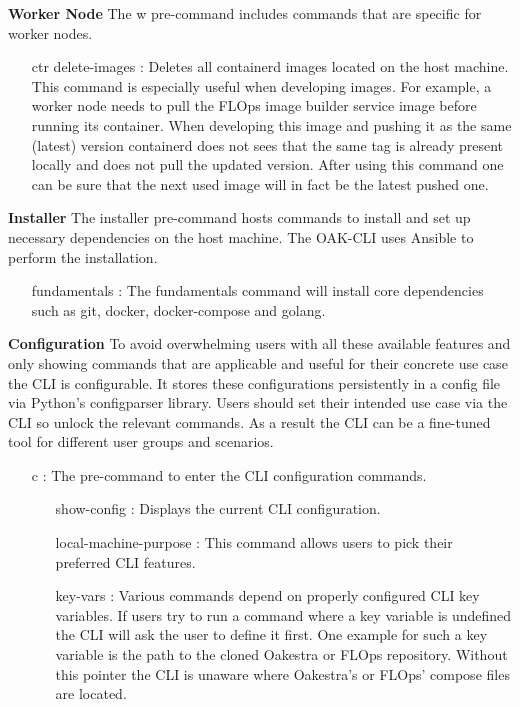 \vspace{5mm}
\textbf{Worker Node}\newline
The w pre-command includes commands that are specific for worker nodes.
\begin{itemize}
    \item [ctr delete-images]:
        Deletes all containerd images located on the host machine.
        This command is especially useful when developing images.
        For example, a worker node needs to pull the FLOps image builder service image before running its container.
        When developing this image and pushing it as the same (latest) version containerd does not sees that the same tag is already present locally and does not pull the updated version.
        After using this command one can be sure that the next used image will in fact be the latest pushed one.
\end{itemize}
\vspace{5mm}
\textbf{Installer}\newline
The installer pre-command hosts commands to install and set up necessary dependencies on the host machine.
The OAK-CLI uses Ansible to perform the installation.
\begin{itemize}
    \item [fundamentals]:
        The fundamentals command will install core dependencies such as git, docker, docker-compose and golang.
\end{itemize}
\vspace{5mm}
\textbf{Configuration}\newline
To avoid overwhelming users with all these available features and only showing commands that are applicable and useful for their concrete use case the CLI is configurable.
It stores these configurations persistently in a config file via Python's configparser library.
Users should set their intended use case via the CLI so unlock the relevant commands.
As a result the CLI can be a fine-tuned tool for different user groups and scenarios.
\begin{itemize}
    \item [c]:
        The pre-command to enter the CLI configuration commands.
        \begin{itemize}
            \item [show-config]:
                Displays the current CLI configuration.
            \item [local-machine-purpose]:
                This command allows users to pick their preferred CLI features.
            \item [key-vars]:
                Various commands depend on properly configured CLI key variables.
                If users try to run a command where a key variable is undefined the CLI will ask the user to define it first.
                One example for such a key variable is the path to the cloned Oakestra or FLOps repository.
                Without this pointer the CLI is unaware where Oakestra's or FLOps' compose files are located.
        \end{itemize}
\end{itemize}
